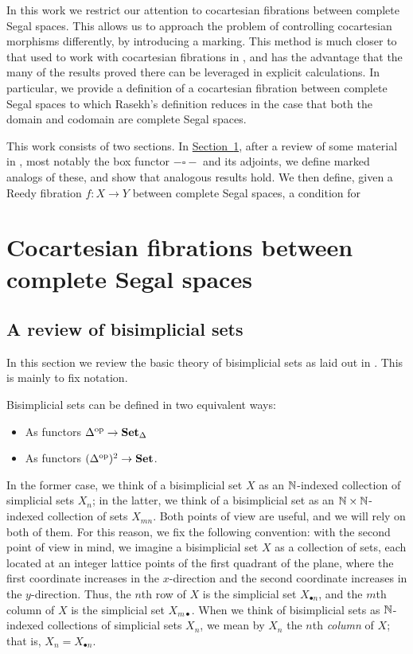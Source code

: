 \documentclass[main.tex]{subfiles}
\begin{document}
In this work we restrict our attention to cocartesian fibrations between complete Segal spaces. This allows us to approach the problem of controlling cocartesian morphisms differently, by introducing a marking. This method is much closer to that used to work with cocartesian fibrations in \cite{highertopostheory}, and has the advantage that the many of the results proved there can be leveraged in explicit calculations. In particular, we provide a definition of a cocartesian fibration between complete Segal spaces to which Rasekh's definition reduces in the case that both the domain and codomain are complete Segal spaces.

This work consists of two sections. In \hyperref[sec:cocartesian_fibrations_between_complete_segal_spaces]{Section~\ref*{sec:cocartesian_fibrations_between_complete_segal_spaces}}, after a review of some material in \cite{qcats_vs_segal_spaces}, most notably the box functor $- \square -$ and its adjoints, we define marked analogs of these, and show that analogous results hold. We then define, given a Reedy fibration $f\colon X \to Y$ between complete Segal spaces, a condition for

\section{Cocartesian fibrations between complete Segal spaces}
\label{sec:cocartesian_fibrations_between_complete_segal_spaces}

\subsection{A review of bisimplicial sets}
\label{ssc:a_review_of_bisimplicial_sets}

In this section we review the basic theory of bisimplicial sets as laid out in \cite{qcats_vs_segal_spaces}. This is mainly to fix notation.

Bisimplicial sets can be defined in two equivalent ways:
\begin{itemize}
  \item As functors $\Delta^{\mathrm{op}} \to \mathbf{Set}_{\Delta}$

  \item As functors $(\Delta^{\mathrm{op}})^{2} \to \mathbf{Set}$.
\end{itemize}
In the former case, we think of a bisimplicial set $X$ as an $\mathbb{N}$-indexed collection of simplicial sets $X_{n}$; in the latter, we think of a bisimplicial set as an $\mathbb{N} \times \mathbb{N}$-indexed collection of sets $X_{mn}$. Both points of view are useful, and we will rely on both of them. For this reason, we fix the following convention: with the second point of view in mind, we imagine a bisimplicial set $X$ as a collection of sets, each located at an integer lattice points of the first quadrant of the plane, where the first coordinate increases in the $x$-direction and the second coordinate increases in the $y$-direction. Thus, the $n$th row of $X$ is the simplicial set $X_{\bullet n}$, and the $m$th column of $X$ is the simplicial set $X_{m \bullet}$. When we think of bisimplicial sets as $\mathbb{N}$-indexed collections of simplicial sets $X_{n}$, we mean by $X_{n}$ the $n$th \emph{column} of $X$; that is, $X_{n} = X_{\bullet n}$.
\end{document}
